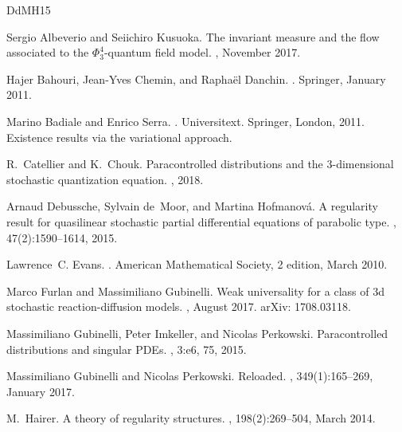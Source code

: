 \documentclass[a4paper,11pt]{article}
\numberwithin{equation}{section}
\newcommand{\8}{\infty}
\begin{document}
\begin{thebibliography}{DdMH15}

Sergio Albeverio and Seiichiro Kusuoka.
\newblock The invariant measure and the flow associated to the
  {$\Phi^4_3$}-quantum field model.
, November 2017.

Hajer Bahouri, Jean-Yves Chemin, and Rapha{\"e}l Danchin.
.
\newblock Springer, January 2011.

Marino Badiale and Enrico Serra.
.
\newblock Universitext. Springer, London, 2011.
\newblock Existence results via the variational approach.

R.~Catellier and K.~Chouk.
\newblock Paracontrolled distributions and the 3-dimensional stochastic
  quantization equation.
, 2018.

Arnaud Debussche, Sylvain de~Moor, and Martina Hofmanov\'a.
\newblock A regularity result for quasilinear stochastic partial differential
  equations of parabolic type.
, 47(2):1590--1614, 2015.

Lawrence~C. Evans.
.
\newblock American Mathematical Society, 2 edition, March 2010.

Marco Furlan and Massimiliano Gubinelli.
\newblock Weak universality for a class of 3d stochastic reaction-diffusion
  models.
, August 2017.
\newblock arXiv: 1708.03118.

Massimiliano Gubinelli, Peter Imkeller, and Nicolas Perkowski.
\newblock Paracontrolled distributions and singular {PDEs}.
, 3:e6, 75, 2015.

Massimiliano Gubinelli and Nicolas Perkowski.
 {Reloaded}.
, 349(1):165--269,
  January 2017.

M.~Hairer.
\newblock A theory of regularity structures.
, 198(2):269--504, March 2014.


\end{thebibliography}
\end{document}

